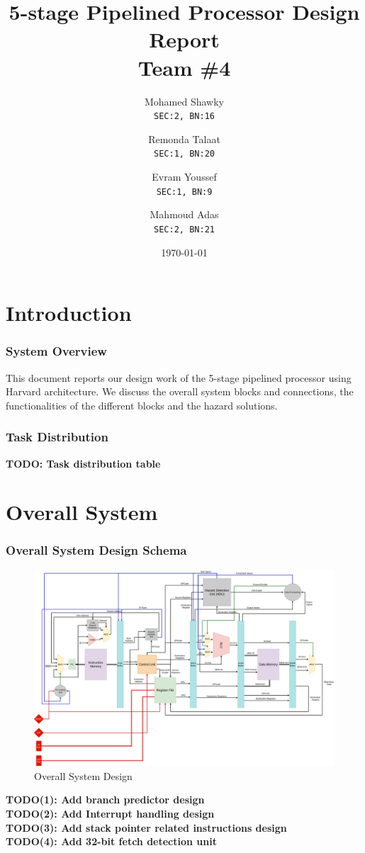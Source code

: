 \documentclass[12pt]{report}
\title{\textbf{5-stage Pipelined Processor Design Report}\\Team \#4}
\author{
  Mohamed Shawky\\
  \small\texttt{SEC:2, BN:16}
  \and
  Remonda Talaat\\
  \small\texttt{SEC:1, BN:20}
  \and
  Evram Youssef\\
  \small\texttt{SEC:1, BN:9}
  \and
  Mahmoud Adas\\
  \small\texttt{SEC:2, BN:21}
}
\date{\today}
\begin{document}
\thispagestyle{empty}

\maketitle
\tableofcontents
\listoffigures
\listoftables
\clearpage


\part{Introduction}

\section{System Overview}
This document reports our design work of the 5-stage pipelined processor using Harvard
architecture. We discuss the overall system blocks and connections, the functionalities of the
different blocks and the hazard solutions. 

\section{Task Distribution}
\textbf{TODO: Task distribution table}

\part{Overall System}

\section{Overall System Design Schema}
\begin{center}
    \begin{figure}[hp]
        \centering
        \includegraphics[width=\textwidth]{overall_system}
        \caption{Overall System Design}
        \label{fig:overall}
    \end{figure}
\end{center}
\textbf{TODO(1): Add branch predictor design}\\
\textbf{TODO(2): Add Interrupt handling design}\\
\textbf{TODO(3): Add stack pointer related instructions design}\\
\textbf{TODO(4): Add 32-bit fetch detection unit}
\end{document}
